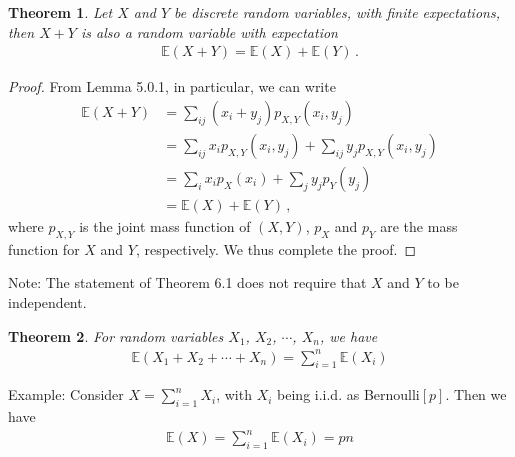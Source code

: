 \documentclass[11pt, onesided]{book}
\theoremstyle{break}
\theoremstyle{break}
\newtheorem{thm}{Theorem}[section]
\newcommand{\note}{\color{red}Note: \color{black}}
\newcommand{\example}{\color{green}Example: \color{black}}
\begin{document}
\begin{thm}
Let $X$ and $Y$ be discrete random variables, with finite expectations, then $X+Y$ is also a random variable with expectation
\begin{align*}
\mathbb{E}(X+Y) = \mathbb{E}(X) + \mathbb{E}(Y)\,.
\end{align*}
\end{thm}
\begin{proof}
From Lemma 5.0.1, in particular, we can write
\begin{align*}
\mathbb{E}(X+Y) 
&= \sum_{ij} (x_i+y_j)p_{X,Y}(x_i, y_j)\\
&= \sum_{ij}x_i p_{X,Y} (x_i,y_j) + \sum_{ij}y_j p_{X,Y}(x_i,y_j)\\
&= \sum_{i}x_ip_X(x_i) + \sum_{j} y_j p_Y(y_j) \\
&= \mathbb{E}(X) + \mathbb{E}(Y)\,,
\end{align*}
where $p_{X,Y}$ is the joint mass function of $(X,Y)$, $p_X$ and $p_Y$ are the mass function for $X$ and $Y$, respectively. We thus complete the proof.  
\end{proof}
\note The statement of Theorem 6.1 does not require that $X$ and $Y$ to be independent. \\



\begin{thm}
For random variables $X_1$, $X_2$, $\cdots$, $X_n$, we have
\begin{align*}
\mathbb{E}(X_1+X_2 +\cdots +X_n) = \sum_{i=1}^n \mathbb{E}(X_i)
\end{align*}
\end{thm}

\example Consider $X = \sum_{i=1}^n X_i$, with $X_i$ being i.i.d. as Bernoulli$[p]$. Then we have
\begin{align*}
\mathbb{E}(X) = \sum_{i=1}^n\mathbb{E}(X_i) = pn
\end{align*}
\end{document}

